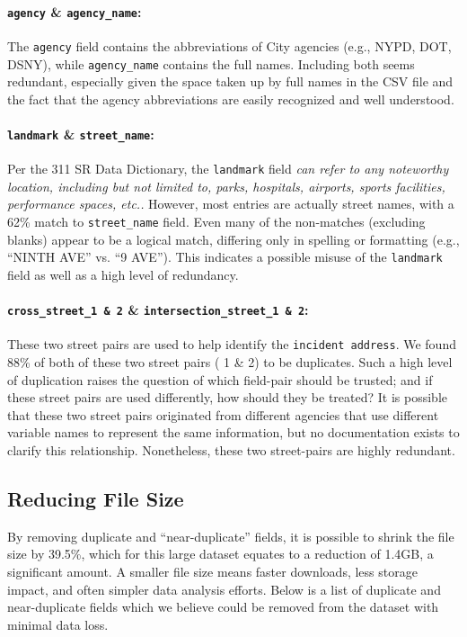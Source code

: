 \documentclass[linenumber]{jdsart}
\begin{document}
\paragraph{\texttt{agency} \& \texttt{agency\_name}:} The \texttt{agency} 
field contains the abbreviations of City agencies (e.g., NYPD, DOT, DSNY), 
while \texttt{agency\_name} contains the full names. Including both seems 
redundant, especially given the space taken up by full names in the 
CSV file and the fact that the agency abbreviations are 
easily recognized and well understood.

\paragraph{\texttt{landmark} \& \texttt{street\_name}:} Per the 
311 SR Data Dictionary, the \texttt{landmark} 
field \textit{can refer to any noteworthy location, 
including but not limited to, parks, hospitals, airports, sports facilities, 
performance spaces, etc..} However, most entries are actually 
street names, with a 62\% match to \texttt{street\_name} field. 
Even many of the non-matches (excluding blanks) appear to be 
a logical match, differing only in spelling or formatting 
(e.g., ``NINTH AVE'' vs. ``9 AVE''). This indicates a possible 
misuse of the \texttt{landmark} field as well as a high level of redundancy.

\paragraph{\texttt{cross\_street\_1 \& 2} \& \texttt{intersection\_street\_1 \& 2}:} These 
two street pairs are used to help identify the 
\texttt{incident address}. We found 88\% of both of these two 
street pairs ( 1 \& 2) to be duplicates. Such a high level of duplication 
raises the question of which field-pair should be trusted; 
and if these street pairs are used differently, how should they be treated?
It is possible that these two street pairs originated from different 
agencies that use different variable names to represent the same 
information, but no documentation exists to clarify this 
relationship. Nonetheless, these two street-pairs are highly redundant.


\subsection{Reducing File Size}
\label{sec:filesize}
By removing duplicate and ``near-duplicate'' fields, it is possible to 
shrink the file size by 39.5\%, which for this large dataset equates to 
a reduction of 1.4GB, a significant amount. A smaller file size 
means faster downloads, less storage impact, and often 
simpler data analysis efforts. Below is a list of duplicate 
and near-duplicate fields which we believe could be
removed from the dataset with minimal data loss. 
\end{document}
